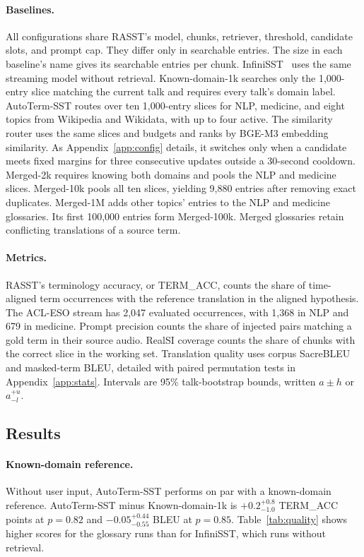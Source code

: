 \paragraph{Baselines.}
All configurations share RASST's model, chunks, retriever, threshold,
candidate slots, and prompt cap. They differ only in searchable entries.
The size in each baseline's name gives its searchable entries per chunk.
InfiniSST~\citep{ouyang2025infinisst} uses the same streaming model without
retrieval. Known-domain-1k searches only the 1,000-entry slice matching the
current talk and requires every talk's domain label. AutoTerm-SST routes over
ten 1,000-entry slices for NLP, medicine, and eight topics from Wikipedia and
Wikidata, with up to four active. The similarity router uses the same slices
and budgets and ranks by BGE-M3 embedding similarity. As
Appendix~\ref{app:config} details, it switches only when a candidate meets
fixed margins for three consecutive updates outside a 30-second cooldown.
Merged-2k requires knowing both domains and pools the NLP and medicine slices.
Merged-10k pools all ten slices, yielding 9,880 entries after removing exact
duplicates. Merged-1M adds other topics' entries to the NLP and medicine
glossaries. Its first 100,000 entries form Merged-100k. Merged glossaries
retain conflicting translations of a source term.

\paragraph{Metrics.}
RASST's terminology accuracy, or TERM\_ACC, counts the share of time-aligned
term occurrences with the reference translation in the aligned hypothesis.
The ACL-ESO stream has 2,047 evaluated occurrences, with 1,368 in NLP and 679 in
medicine. Prompt precision counts the share of injected pairs matching a gold
term in their source audio. RealSI coverage counts the share of chunks with the
correct slice in the working set. Translation quality uses corpus SacreBLEU and masked-term BLEU, detailed with paired permutation tests in Appendix~\ref{app:stats}. Intervals are 95\% talk-bootstrap bounds, written $a\pm h$ or $a^{+u}_{-l}$.

\subsection{Results}


\paragraph{Known-domain reference.}
Without user input, AutoTerm-SST performs on par with a known-domain reference.
AutoTerm-SST minus Known-domain-1k is $+0.2^{+0.8}_{-1.0}$ TERM\_ACC points
at $p=0.82$ and $-0.05^{+0.44}_{-0.55}$ BLEU at $p=0.85$.
Table~\ref{tab:quality} shows higher scores for the glossary runs than for
InfiniSST, which runs without retrieval.

